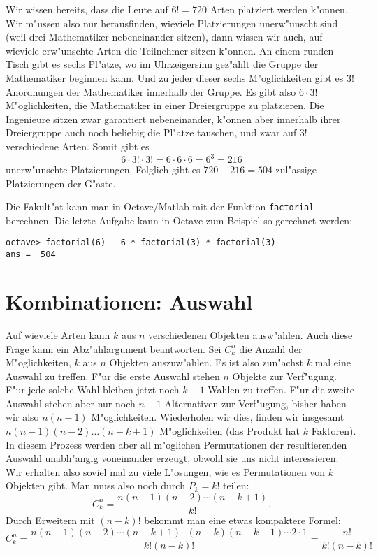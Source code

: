 \begin{beispiele}
\begin{loesung}
\begin{teilaufgaben}
Wir wissen bereits, dass die Leute auf $6!=720$ Arten platziert werden
k"onnen. Wir m"ussen also nur herausfinden, wieviele Platzierungen
unerw"unscht sind (weil drei Mathematiker nebeneinander sitzen),
dann wissen wir auch, auf wieviele erw"unschte Arten die Teilnehmer
sitzen k"onnen.
An einem runden Tisch gibt es sechs Pl"atze, wo im Uhrzeigersinn gez"ahlt 
die Gruppe der Mathematiker beginnen kann. Und zu jeder dieser
sechs M"oglichkeiten gibt es $3!$ Anordnungen der Mathematiker innerhalb
der Gruppe. Es gibt also $6 \cdot 3!$ M"oglichkeiten, die Mathematiker
in einer Dreiergruppe zu platzieren.
Die Ingenieure sitzen zwar garantiert nebeneinander, k"onnen aber
innerhalb ihrer Dreiergruppe auch noch beliebig die Pl"atze
tauschen, und zwar auf $3!$ verschiedene Arten. Somit gibt es
\[
6\cdot 3!\cdot 3!=6\cdot 6\cdot 6=6^3=216
\]
unerw"unschte Platzierungen. Folglich gibt es $720-216=504$ zul"assige
Platzierungen der G"aste.
\end{teilaufgaben}
\end{loesung}

\end{beispiele}

Die Fakult"at kann man in Octave/Matlab mit der Funktion {\tt factorial}
berechnen. Die letzte Aufgabe kann in Octave zum Beispiel so gerechnet
werden:
\begin{verbatim}
octave> factorial(6) - 6 * factorial(3) * factorial(3)
ans =  504
\end{verbatim}

\section{Kombinationen: Auswahl}
Auf wieviele Arten kann $k$ aus $n$ verschiedenen Objekten
ausw"ahlen. Auch diese Frage kann ein Abz"ahlargument
beantworten.  Sei $C^n_k$ die Anzahl der M"oglichkeiten,
$k$ aus $n$ Objekten auszuw"ahlen. Es ist also zun"achst
$k$ mal eine Auswahl zu treffen. F"ur die erste Auswahl
stehen $n$ Objekte zur Verf"ugung. F"ur jede solche Wahl
bleiben jetzt noch $k-1$ Wahlen zu treffen. F"ur die zweite
Auswahl stehen aber nur noch $n-1$ Alternativen zur Verf"ugung,
bisher haben wir also $n(n-1)$ M"oglichkeiten. Wiederholen wir
dies, finden wir insgesamt $n(n-1)(n-2)\dots(n-k+1)$ M"oglichkeiten
(das Produkt hat $k$ Faktoren). In diesem Prozess werden
aber all m"oglichen Permutationen der resultierenden Auswahl
unabh"angig voneinander erzeugt, obwohl sie uns nicht
interessieren. Wir erhalten also soviel mal zu viele L"osungen, wie
es Permutationen von $k$ Objekten gibt. Man muss also noch durch
$P_k=k!$ teilen:
\[
C^n_k=\frac{n(n-1)(n-2)\cdots(n-k+1)}{k!}.
\]
Durch Erweitern mit $(n-k)!$ bekommt man eine etwas
kompaktere Formel:
\[
C^n_k=\frac{n(n-1)(n-2)\cdots(n-k+1)\cdot(n-k)(n-k-1)\cdots2\cdot 1}{k!(n-k)!}
=\frac{n!}{k!(n-k)!}
\]

